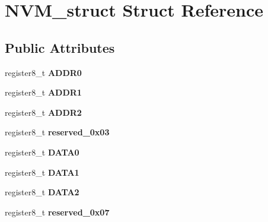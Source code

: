 \hypertarget{struct_n_v_m__struct}{}\section{N\+V\+M\+\_\+struct Struct Reference}
\label{struct_n_v_m__struct}
\subsection*{Public Attributes}
\begin{DoxyCompactItemize}
\item 
register8\+\_\+t {\bfseries A\+D\+D\+R0}\hypertarget{struct_n_v_m__struct_ad8b53ef342d117b9e85a670e06219597}{}\label{struct_n_v_m__struct_ad8b53ef342d117b9e85a670e06219597}

\item 
register8\+\_\+t {\bfseries A\+D\+D\+R1}\hypertarget{struct_n_v_m__struct_ad4421f9c21f662620a89d14b2a3a98fb}{}\label{struct_n_v_m__struct_ad4421f9c21f662620a89d14b2a3a98fb}

\item 
register8\+\_\+t {\bfseries A\+D\+D\+R2}\hypertarget{struct_n_v_m__struct_a7ad724fd0577fed763a8885746551836}{}\label{struct_n_v_m__struct_a7ad724fd0577fed763a8885746551836}

\item 
register8\+\_\+t {\bfseries reserved\+\_\+0x03}\hypertarget{struct_n_v_m__struct_a377563572a5ecc2cadeadff923266780}{}\label{struct_n_v_m__struct_a377563572a5ecc2cadeadff923266780}

\item 
register8\+\_\+t {\bfseries D\+A\+T\+A0}\hypertarget{struct_n_v_m__struct_aae250675c0d09bce387fe429af972fb1}{}\label{struct_n_v_m__struct_aae250675c0d09bce387fe429af972fb1}

\item 
register8\+\_\+t {\bfseries D\+A\+T\+A1}\hypertarget{struct_n_v_m__struct_a16ab5a6b5525f905152f2233e6f49f41}{}\label{struct_n_v_m__struct_a16ab5a6b5525f905152f2233e6f49f41}

\item 
register8\+\_\+t {\bfseries D\+A\+T\+A2}\hypertarget{struct_n_v_m__struct_a8a857a9fcf7161c78e4bd193c68064c4}{}\label{struct_n_v_m__struct_a8a857a9fcf7161c78e4bd193c68064c4}

\item 
register8\+\_\+t {\bfseries reserved\+\_\+0x07}\hypertarget{struct_n_v_m__struct_a9398cc7991c7f91625d9312f0455f44b}{}\label{struct_n_v_m__struct_a9398cc7991c7f91625d9312f0455f44b}


\end{DoxyCompactItemize}
